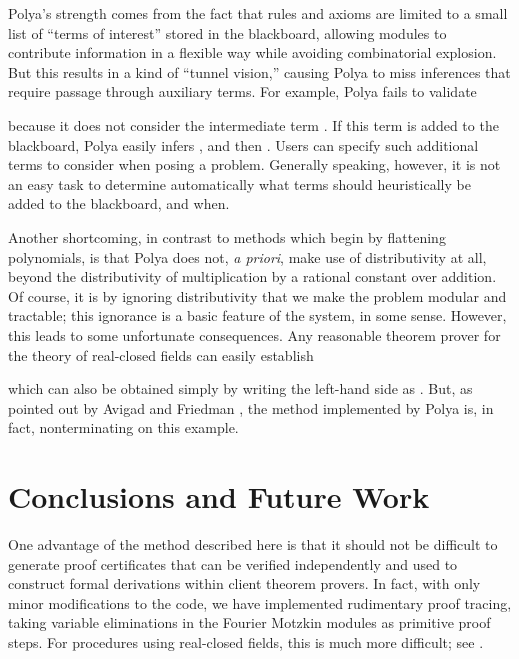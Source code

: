 \documentclass[runningheds]{llncs}
\begin{document}
Polya's strength comes from the fact that rules and axioms are limited to a small list of ``terms of interest'' stored in the blackboard, allowing modules to contribute information in a flexible way while avoiding combinatorial explosion. But this results in a kind of ``tunnel vision,'' causing Polya to miss inferences that require passage through auxiliary terms. For example, Polya fails to validate

because it does not consider the intermediate term . If this term is added to the blackboard, Polya easily infers , and then . Users can specify such additional terms to consider when posing a problem. Generally speaking, however, it is not an easy task to determine automatically what terms should heuristically be added to the blackboard, and when.

Another shortcoming, in contrast to methods which begin by flattening polynomials, is that Polya does not, \emph{a priori}, make use of distributivity at all, beyond the distributivity of multiplication by a rational constant over addition. Of course, it is by ignoring distributivity that we make the problem modular and tractable; this ignorance is a basic feature of the system, in some sense. However, this leads to some unfortunate consequences. Any reasonable theorem prover for the theory of real-closed fields can easily establish

which can also be obtained simply by writing the left-hand side as . But, as pointed out by Avigad and Friedman \cite{avigad:friedman:06}, the method implemented by Polya is, in fact, nonterminating on this example.


\section{Conclusions and Future Work}
\label{section:conclusions}

One advantage of the method described here is that it should not be difficult to generate proof certificates that can be verified independently and used to construct formal derivations within client theorem provers. In fact, with only minor modifications to the code, we have implemented rudimentary proof tracing, taking variable eliminations in the Fourier Motzkin modules as primitive proof steps. For procedures using real-closed fields, this is much more difficult; see \cite{mclaughlin:harrison:05} \cite{harrison:07b}.
\end{document}
